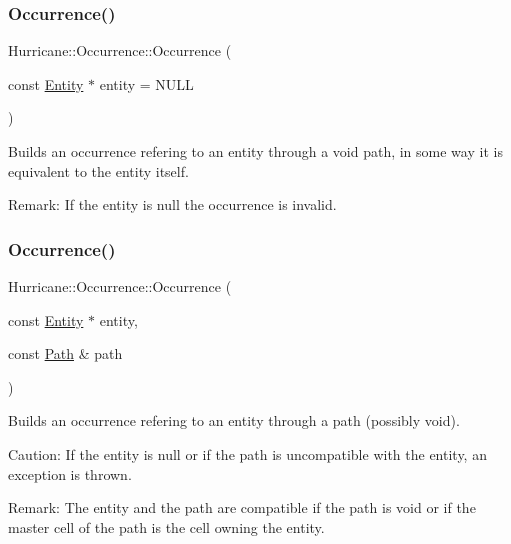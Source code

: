 \subsubsection{\texorpdfstring{Occurrence()}{Occurrence()}\hspace{0.1cm}{\footnotesize\ttfamily [1/3]}}
{\footnotesize\ttfamily Hurricane\+::\+Occurrence\+::\+Occurrence (\begin{DoxyParamCaption}\item[{const \hyperlink{classHurricane_1_1Entity}{Entity} $\ast$}]{entity = {\ttfamily NULL} }\end{DoxyParamCaption})}

Builds an occurrence refering to an entity through a void path, in some way it is equivalent to the entity itself.

\begin{DoxyParagraph}{Remark\+:}
If the entity is null the occurrence is invalid. 
\end{DoxyParagraph}
\mbox{\label{classHurricane_1_1Occurrence_afedb5d75781a9a4f0a19d37f0e8c88a8}} 
\subsubsection{\texorpdfstring{Occurrence()}{Occurrence()}\hspace{0.1cm}{\footnotesize\ttfamily [2/3]}}
{\footnotesize\ttfamily Hurricane\+::\+Occurrence\+::\+Occurrence (\begin{DoxyParamCaption}\item[{const \hyperlink{classHurricane_1_1Entity}{Entity} $\ast$}]{entity,  }\item[{const \hyperlink{classHurricane_1_1Path}{Path} \&}]{path }\end{DoxyParamCaption})}

Builds an occurrence refering to an entity through a path (possibly void).

\begin{DoxyParagraph}{Caution\+:}
If the entity is null or if the path is uncompatible with the entity, an exception is thrown.
\end{DoxyParagraph}
\begin{DoxyParagraph}{Remark\+:}
The entity and the path are compatible if the path is void or if the master cell of the path is the cell owning the entity. 
\end{DoxyParagraph}
\mbox{\label{classHurricane_1_1Occurrence_affec5f25b9c2efa2bcde02e9c4833626}} 
